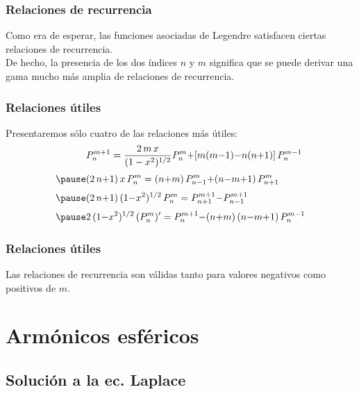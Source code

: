 \documentclass[12pt]{beamer}
\begin{document}
\begin{frame}
\frametitle{Relaciones de recurrencia}
Como era de esperar, las funciones asociadas de Legendre satisfacen ciertas relaciones de recurrencia.
\\
\bigskip
\pause
De hecho, la presencia de los dos índices $n$ y $m$ significa que se puede derivar una gama mucho más amplia de relaciones de recurrencia.
\end{frame}
\begin{frame}
\frametitle{Relaciones útiles}
Presentaremos sólo cuatro de las relaciones más útiles:
\pause
\begin{eqnarray*}
\begin{aligned}
&P_{n}^{m+1} = \dfrac{2 \, m \, x}{(1-x^{2})^{1/2}} P_{n}^{m} {+} [m(m {-} 1) {-} n (n {+} 1)] \, P_{n}^{m-1} \\[0.25em] \pause
&(2 \, n {+} 1) \, x \, P_{n}^{m} = (n {+} m) \, P_{n-1}^{m} {+} (n {-} m {+} 1) \, P_{n+1}^{m} \\[0.25em] \pause
&(2 \, n {+} 1) \, (1 {-} x^{2})^{1/2} \, P_{n}^{m} = P_{n+1}^{m+1} {-} P_{n-1}^{m+1} \\[0.25em] \pause
&2 \, (1 {-} x^{2})^{1/2} \, (P_{n}^{m})^{\prime} = P_{n}^{m+1} {-} (n {+} m) \, (n {-} m {+} 1) \, P_{n}^{m-1}
\end{aligned}
\end{eqnarray*}
\end{frame}
\begin{frame}
\frametitle{Relaciones útiles}
Las relaciones de recurrencia son válidas tanto para valores negativos como positivos de $m$.
\end{frame}

\section{Armónicos esféricos}
\subsection{Solución a la ec. Laplace}
\end{document}
